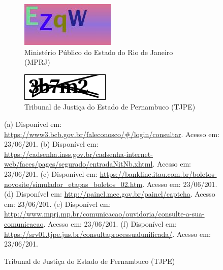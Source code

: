 \begin{figure}[ht]
	\vspace{.05\linewidth}
	\begin{subfigure}[t]{.475\textwidth}
		\centering
		\includegraphics[width=.9\linewidth, height=.4\linewidth]{figuras/captcha_mprj.jpeg}
		\caption{Ministério Público do Estado do Rio de Janeiro (MPRJ)}
	\end{subfigure}
	\hspace{.05\textwidth}
	\begin{subfigure}[t]{.475\textwidth}
		\centering
		\includegraphics[width=.9\linewidth, height=.4\linewidth]{figuras/captcha_tjpe.png}
		\caption{Tribunal de Justiça do Estado de Pernambuco (TJPE)}
	\end{subfigure}%
	\vspace{.05\linewidth}	
	\small 
	(a) Disponível em: \url{https://www3.bcb.gov.br/faleconosco/#/login/consultar}. Acesso em: 23/06/201.
	(b) Disponível em: \url{https://cadsenha.inss.gov.br/cadsenha-internet-web/faces/pages/segurado/entradaNitNb.xhtml}. Acesso em: 23/06/201. 
	(c) Disponível em: \url{https://bankline.itau.com.br/boletos-novosite/simulador_etapas_boletos_02.htm}. Acesso em: 23/06/201.
	(d) Disponível em: \url{http://painel.mec.gov.br/painel/captcha}. Acesso em: 23/06/201. 
	(e) Disponível em: \url{http://www.mprj.mp.br/comunicacao/ouvidoria/consulte-a-sua-comunicacao}. Acesso em: 23/06/201. 
	(f) Disponível em: \url{https://srv01.tjpe.jus.br/consultaprocessualunificada/}. Acesso em: 23/06/201.
\end{figure}


